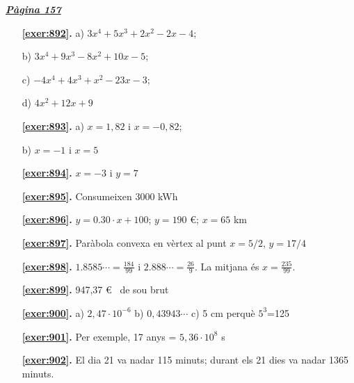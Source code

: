 
\hyperlink{page.157}{\textbf{\em Pàgina 157}}
\begin{enumerate}
\item[\fontfamily{phv}\selectfont\color{blue}\textbf{\ref{exer:892}. }] \label{ans:892} 
 a) $3x^4+5x^3+2x^2-2x-4$; \par b) $3x^4+9x^3-8x^2+10x-5$; \par c) $-4x^4+4x^3+x^2-23x-3$; \par d) $4x^2+12x+9$
 \end{enumerate}
\begin{enumerate}
\item[\fontfamily{phv}\selectfont\color{blue}\textbf{\ref{exer:893}. }] \label{ans:893} 
 a) $x=1,82$ i $x=-0,82$; \par b) $x=-1$ i $x=5$
\item[\fontfamily{phv}\selectfont\color{blue}\textbf{\ref{exer:894}. }] \label{ans:894} 
 $x=-3$ i $y=7$
\item[\fontfamily{phv}\selectfont\color{blue}\textbf{\ref{exer:895}. }] \label{ans:895} 
 Consumeixen $3000$ kWh
\item[\fontfamily{phv}\selectfont\color{blue}\textbf{\ref{exer:896}. }] \label{ans:896} 
 $y=0.30 \cdot x + 100$; \quad $y=190$ €; \quad $x=65$ km
\item[\fontfamily{phv}\selectfont\color{blue}\textbf{\ref{exer:897}. }] \label{ans:897} 
 Paràbola convexa en vèrtex al punt $x=5/2$, $y=17/4$
\item[\fontfamily{phv}\selectfont\color{blue}\textbf{\ref{exer:898}. }] \label{ans:898} 
 $1.8585\cdots = \frac {184}{99}$ i $2.888 \cdots = \frac {26}{9}$. La mitjana és $x=\frac {235}{99}$. 
\item[\fontfamily{phv}\selectfont\color{blue}\textbf{\ref{exer:899}. }] \label{ans:899} 
 947,37 \euro {} \ de sou brut
\item[\fontfamily{phv}\selectfont\color{blue}\textbf{\ref{exer:900}. }] \label{ans:900} 
 a) $2,47\cdot 10^{-6}$ \quad b) $0,43943\cdots $ \quad c) 5 cm perquè $5^{3}$=125
\item[\fontfamily{phv}\selectfont\color{blue}\textbf{\ref{exer:901}. }] \label{ans:901} 
 Per exemple, 17 anys = $5,36\cdot 10^{8}$ s
\item[\fontfamily{phv}\selectfont\color{blue}\textbf{\ref{exer:902}. }] \label{ans:902} 
El dia 21 va nadar 115 minuts; durant els 21 dies va nadar 1365 minuts.
 \end{enumerate}
\vspace{0.3cm}

